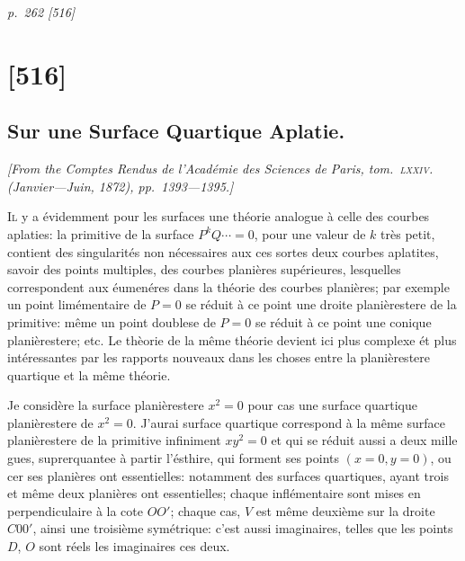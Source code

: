\documentclass[11pt,a4paper]{book}
\begin{document}
\clearpage

\bigskip
\textit{p.~262 [516]}
\smallskip

\section{[516]}
\subsection{Sur une Surface Quartique Aplatie.}

\begin{center}
\textit{[From the \textit{Comptes Rendus de l'Acad\'emie des Sciences de Paris}, tom.~\textsc{lxxiv}. (Janvier---Juin, 1872), pp.~1393---1395.]}
\end{center}

\textsc{Il} y a \'evidemment pour les surfaces une th\'eorie analogue \`a celle des courbes
aplaties: la primitive de la surface $P^kQ \cdots = 0$, pour une valeur de $k$ tr\`es petit,
contient des singularit\'es non n\'ecessaires aux ces sortes deux courbes aplatites, savoir des
points multiples, des courbes plani\`eres sup\'erieures, lesquelles correspondent aux \'eumen\'eres dans
la th\'eorie des courbes plani\`eres; par exemple un point lim\'ementaire de $P = 0$ se r\'eduit \`a
ce point une droite plani\`erestere de la primitive: m\^eme un point doublese de $P = 0$ se
r\'eduit \`a ce point une conique plani\`erestere; etc. Le th\`eorie de la m\^eme th\'eorie devient ici
plus complexe \'et plus int\'eressantes par les rapports nouveaux dans les choses entre la
plani\`erestere quartique et la m\^eme th\'eorie.

Je consid\`ere la surface plani\`erestere $x^2 = 0$ pour cas une surface quartique plani\`erestere de $x^2 = 0$.
J'aurai surface quartique correspond \`a la m\^eme surface plani\`erestere de la primitive infiniment $xy^2 = 0$ et qui se r\'eduit aussi a deux mille gues, suprerquantee
\`a partir l'\'esthire, qui forment ses points $(x = 0, y = 0)$, ou cer ses
plani\`eres ont essentielles: notamment des surfaces quartiques, ayant trois et m\^eme deux
plani\`eres ont essentielles; chaque infl\'ementaire sont mises en perpendiculaire \`a la cote $OO'$;
chaque cas, $V$ est m\^eme deuxi\`eme sur la droite $C00'$, ainsi une troisi\`eme sym\'etrique:
c'est aussi imaginaires, telles que les points $D$, $O$ sont r\'eels les imaginaires ces deux.
\end{document}
